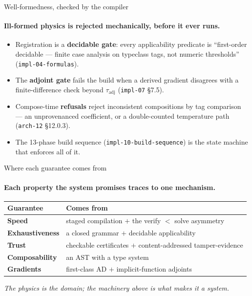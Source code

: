 \documentclass[aspectratio=169,10pt]{beamer}
\newcommand{\code}[1]{\texttt{#1}}
\newcommand{\cz}[1]{({\scriptsize\color{gray}#1})}     %
\begin{document}
\begin{frame}{Well-formedness, checked by the compiler}
  \framesubtitle{Ill-formed physics is rejected mechanically, before it ever runs.}
  \begin{itemize}
    \item Registration is a \textbf{decidable gate}: every applicability predicate is
      ``first-order decidable --- finite case analysis on typeclass tags, not numeric thresholds''
      \cz{\code{impl-04-formulas}}.
    \item The \textbf{adjoint gate} fails the build when a derived gradient disagrees with a
      finite-difference check beyond $\tau_{\mathrm{adj}}$ \cz{\code{impl-07} \S7.5}.
    \item Compose-time \textbf{refusals} reject inconsistent compositions by tag comparison --- an
      unprovenanced coefficient, or a double-counted temperature path \cz{\code{arch-12} \S12.0.3}.
    \item The 13-phase build sequence \cz{\code{impl-10-build-sequence}} is the state machine that
      enforces all of it.
  \end{itemize}
\end{frame}

\begin{frame}{Where each guarantee comes from}
  \framesubtitle{Each property the system promises traces to one mechanism.}
  \setlength{\tabcolsep}{8pt}
  \renewcommand{\arraystretch}{1.25}
  \begin{center}
  \begin{tabular}{@{}ll@{}}
    \toprule
    Guarantee & Comes from\\
    \midrule
    \textbf{Speed} & staged compilation $+$ the verify $<$ solve asymmetry\\
    \textbf{Exhaustiveness} & a closed grammar $+$ decidable applicability\\
    \textbf{Trust} & checkable certificates $+$ content-addressed tamper-evidence\\
    \textbf{Composability} & an AST with a type system\\
    \textbf{Gradients} & first-class AD $+$ implicit-function adjoints\\
    \bottomrule
  \end{tabular}
  \end{center}
  \vspace{1em}
  \centering\itshape The physics is the domain; the machinery above is what makes it a system.
\end{frame}
\end{document}
